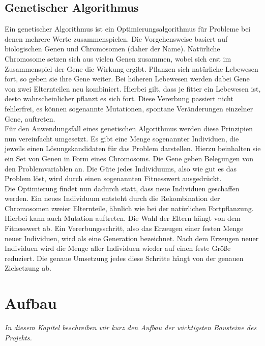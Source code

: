 \documentclass[
	12pt,
	a4paper,
	BCOR10mm,
	DIV14,
	headsepline,
	usegeometry,
]{scrreprt}
\begin{document}
\section{Genetischer Algorithmus}
Ein genetischer Algorithmus ist ein Optimierungsalgorithmus für Probleme bei denen mehrere Werte zusammenspielen. Die Vorgehensweise basiert auf biologischen Genen und Chromosomen (daher der Name). Natürliche Chromosome setzen sich aus vielen Genen zusammen, wobei sich erst im Zusammenspiel der Gene die Wirkung ergibt. Pflanzen sich natürliche Lebewesen fort, so geben sie ihre Gene weiter. Bei höheren Lebewesen werden dabei Gene von zwei Elternteilen neu kombiniert. Hierbei gilt, dass je fitter ein Lebewesen ist, desto wahrscheinlicher pflanzt es sich fort. Diese Vererbung passiert nicht fehlerfrei, es können sogenannte Mutationen, spontane Veränderungen einzelner Gene, auftreten.\\
Für den Anwendungsfall eines genetischen Algorithmus werden diese Prinzipien nun vereinfacht umgesetzt. Es gibt eine Menge sogenannter Individuen, die jeweils einen Lösungskandidaten für das Problem darstellen. Hierzu beinhalten sie ein Set von Genen in Form eines Chromosoms. Die Gene geben Belegungen von den Problemvariablen an. Die Güte jedes Individuums, also wie gut es das Problem löst, wird durch einen sogenannten Fitnesswert ausgedrückt.\\
Die Optimierung findet nun dadurch statt, dass neue Individuen geschaffen werden. Ein neues Individuum entsteht durch die Rekombination der Chromosomen zweier Elternteile, ähnlich wie bei der natürlichen Fortpflanzung. Hierbei kann auch Mutation auftreten. Die Wahl der Eltern hängt von dem Fitnesswert ab. Ein Vererbungsschritt, also das Erzeugen einer festen Menge neuer Individuen, wird als eine Generation bezeichnet. Nach dem Erzeugen neuer Individuen wird die Menge aller Individuen wieder auf einen feste Größe reduziert. Die genaue Umsetzung jedes diese Schritte hängt von der genauen Zielsetzung ab.



\chapter{Aufbau}
\label{Aufbau}

\textit{%
In diesem Kapitel beschreiben wir kurz den Aufbau der wichtigsten Bausteine des Projekts.
}

\bigskip
\end{document}

